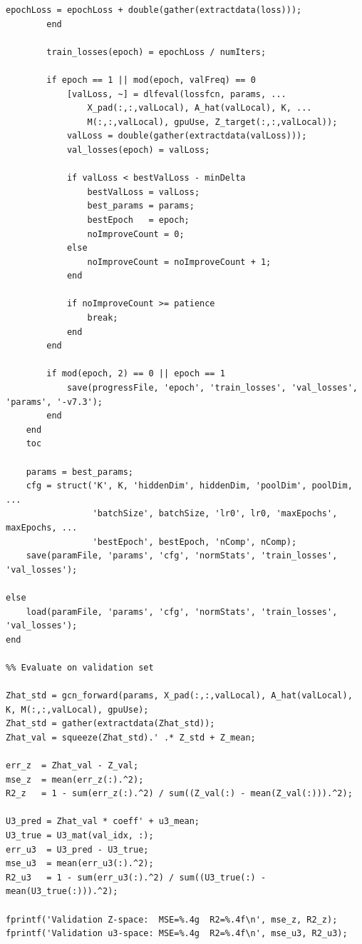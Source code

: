 \documentclass[11pt]{article}
\begin{document}
\begin{lstlisting}[caption={\texttt{models/Main.m}}]
            epochLoss = epochLoss + double(gather(extractdata(loss)));
        end

        train_losses(epoch) = epochLoss / numIters;

        if epoch == 1 || mod(epoch, valFreq) == 0
            [valLoss, ~] = dlfeval(lossfcn, params, ...
                X_pad(:,:,valLocal), A_hat(valLocal), K, ...
                M(:,:,valLocal), gpuUse, Z_target(:,:,valLocal));
            valLoss = double(gather(extractdata(valLoss)));
            val_losses(epoch) = valLoss;

            if valLoss < bestValLoss - minDelta
                bestValLoss = valLoss;
                best_params = params;
                bestEpoch   = epoch;
                noImproveCount = 0;
            else
                noImproveCount = noImproveCount + 1;
            end

            if noImproveCount >= patience
                break;
            end
        end

        if mod(epoch, 2) == 0 || epoch == 1
            save(progressFile, 'epoch', 'train_losses', 'val_losses', 'params', '-v7.3');
        end
    end
    toc

    params = best_params;
    cfg = struct('K', K, 'hiddenDim', hiddenDim, 'poolDim', poolDim, ...
                 'batchSize', batchSize, 'lr0', lr0, 'maxEpochs', maxEpochs, ...
                 'bestEpoch', bestEpoch, 'nComp', nComp);
    save(paramFile, 'params', 'cfg', 'normStats', 'train_losses', 'val_losses');

else
    load(paramFile, 'params', 'cfg', 'normStats', 'train_losses', 'val_losses');
end

%% Evaluate on validation set

Zhat_std = gcn_forward(params, X_pad(:,:,valLocal), A_hat(valLocal), K, M(:,:,valLocal), gpuUse);
Zhat_std = gather(extractdata(Zhat_std));
Zhat_val = squeeze(Zhat_std).' .* Z_std + Z_mean;

err_z  = Zhat_val - Z_val;
mse_z  = mean(err_z(:).^2);
R2_z   = 1 - sum(err_z(:).^2) / sum((Z_val(:) - mean(Z_val(:))).^2);

U3_pred = Zhat_val * coeff' + u3_mean;
U3_true = U3_mat(val_idx, :);
err_u3  = U3_pred - U3_true;
mse_u3  = mean(err_u3(:).^2);
R2_u3   = 1 - sum(err_u3(:).^2) / sum((U3_true(:) - mean(U3_true(:))).^2);

fprintf('Validation Z-space:  MSE=%.4g  R2=%.4f\n', mse_z, R2_z);
fprintf('Validation u3-space: MSE=%.4g  R2=%.4f\n', mse_u3, R2_u3);
\end{lstlisting}
\end{document}
